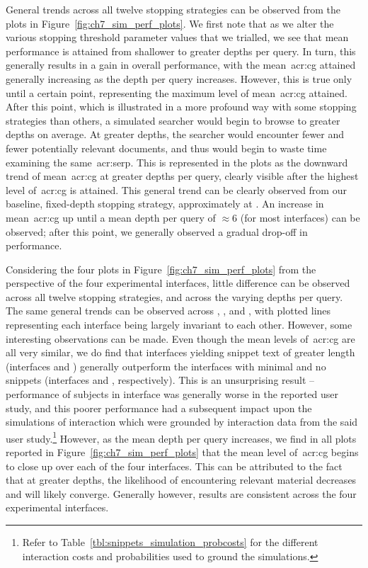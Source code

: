General trends across all twelve stopping strategies can be observed from the plots in Figure~\ref{fig:ch7_sim_perf_plots}. We first note that as we alter the various stopping threshold parameter values that we trialled, we see that mean performance is attained from shallower to greater depths per query. In turn, this generally results in a gain in overall performance, with the mean~\gls{acr:cg} attained generally increasing as the depth per query increases. However, this is true only until a certain point, representing the maximum level of mean~\gls{acr:cg} attained. After this point, which is illustrated in a more profound way with some stopping strategies than others, a simulated searcher would begin to browse to greater depths on average. At greater depths, the searcher would encounter fewer and fewer potentially relevant documents, and thus would begin to waste time examining the same~\gls{acr:serp}. This is represented in the plots as the downward trend of mean~\gls{acr:cg} at greater depths per query, clearly visible after the highest level of~\gls{acr:cg} is attained. This general trend can be clearly observed from our baseline, fixed-depth stopping strategy, approximately at . An increase in mean~\gls{acr:cg} up until a mean depth per query of $\approx6$ (for most interfaces) can be observed; after this point, we generally observed a gradual drop-off in performance.

    Considering the four plots in Figure~\ref{fig:ch7_sim_perf_plots} from the perspective of the four experimental interfaces, little difference can be observed across all twelve stopping strategies, and across the varying depths per query. The same general trends can be observed across , ,  and , with plotted lines representing each interface being largely invariant to each other. However, some interesting observations can be made. Even though the mean levels of~\gls{acr:cg} are all very similar, we do find that interfaces yielding snippet text of greater length (interfaces  and ) generally outperform the interfaces with minimal and no snippets (interfaces  and , respectively). This is an unsurprising result -- performance of subjects in interface  was generally worse in the reported user study, and this poorer performance had a subsequent impact upon the simulations of interaction which were grounded by interaction data from the said user study.\footnote{Refer to Table~\ref{tbl:snippets_simulation_probcosts} for the different interaction costs and probabilities used to ground the simulations.} However, as the mean depth per query increases, we find in all plots reported in Figure~\ref{fig:ch7_sim_perf_plots} that the mean level of~\gls{acr:cg} begins to close up over each of the four interfaces. This can be attributed to the fact that at greater depths, the likelihood of encountering relevant material decreases and will likely converge. Generally however, results are consistent across the four experimental interfaces.


